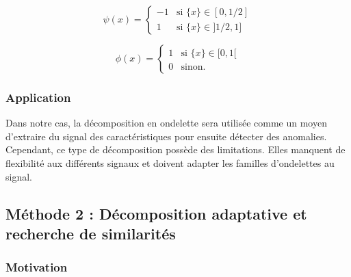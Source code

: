 \begin{equation}
\psi(x) = \left\{
    \begin{array}{ll}
        -1 & \mbox{si } \{x\} \in [0,1/2] \\
        1 & \mbox{si } \{x\} \in ]1/2,1]
    \end{array}
\right.
\end{equation}


\begin{equation}
\phi(x) = \left\{
    \begin{array}{ll}
        1 & \mbox{si } \{x\} \in [0,1[ \\
        0 & \mbox{sinon.} 
     \end{array}
\right.
\end{equation}


\subsubsection{Application}

Dans notre cas, la décomposition en ondelette sera utilisée comme un moyen d'extraire du signal des caractéristiques pour ensuite détecter des anomalies.
Cependant, ce type de décomposition possède des limitations. 
Elles manquent de flexibilité aux différents signaux et doivent adapter les familles d'ondelettes au signal.

\subsection{Méthode 2 : Décomposition adaptative et recherche de similarités}

\subsubsection{Motivation}
\paragraph{}

